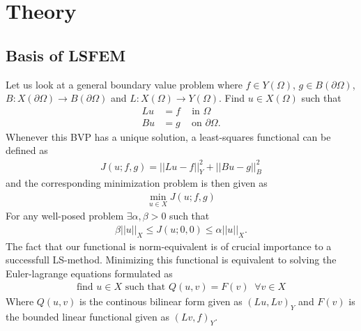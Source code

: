 
\chapter{Theory} %

\label{chap:theory} %


\section{Basis of LSFEM}
Let us look at a general boundary value problem where $f \in Y(\Omega)$, $g \in B(\partial \Omega)$, $B:X(\partial \Omega) \rightarrow B(\partial\Omega) $ and $L:X(\Omega)\rightarrow Y(\Omega)$. Find $u \in X(\Omega) $ such that 
\begin{align}
	Lu &= f \; \; \; \text{ in } \Omega \\
	Bu &= g \; \; \; \text{ on } \partial \Omega.
	\label{eq:BVP}
\end{align}
Whenever this BVP has a unique solution, a least-squares functional can be defined as 
\begin{align}
	J(u;f,g) = ||Lu-f||^2_Y + ||Bu-g||^2_B
	\label{eq:FunctionalGen}
\end{align}
and the corresponding minimization problem is then given as 
\begin{align}
	\min_{u \in X}J(u;f,g)
	\label{eq:minProbGen}
\end{align}
For any well-posed problem $\exists \alpha,\beta > 0$ such that 
\begin{align}
	\beta||u||_X \leq J(u;0,0) \leq \alpha||u||_X.
	\label{eq:normEq}
\end{align}
The fact that our functional is norm-equivalent is of crucial importance to a successfull LS-method.  
Minimizing this functional is equivalent to solving the Euler-lagrange equations formulated as 
\begin{align}
	\text{find } u \in X \text{  such that  } Q(u,v) = F(v) \; \; \forall v\in X
	\label{eq:varFormGen}
\end{align}
Where $Q(u,v)$ is the continous bilinear form given as $(Lu,Lv)_Y$ and $F(v)$ is the bounded linear functional given as $(Lv,f)_Y$.

